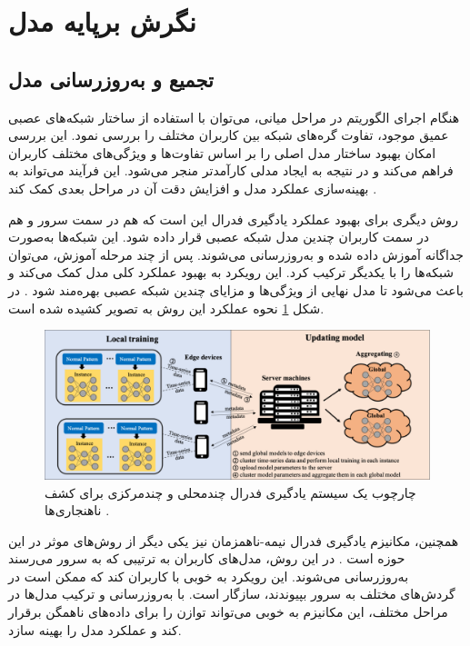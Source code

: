 \section{نگرش برپایه مدل}
\subsection{
	تجمیع و به‌روزرسانی مدل%
}	
هنگام اجرای الگوریتم در مراحل میانی، می‌توان با استفاده از ساختار شبکه‌های عصبی عمیق موجود، تفاوت گره‌های شبکه بین کاربران مختلف را بررسی نمود. این بررسی امکان بهبود ساختار مدل اصلی را بر اساس تفاوت‌ها و ویژگی‌های مختلف کاربران فراهم می‌کند و در نتیجه به ایجاد مدلی کارآمدتر منجر می‌شود. این فرآیند می‌تواند به بهینه‌سازی عملکرد مدل و افزایش دقت آن در مراحل بعدی کمک کند
\cite{sannara2021federated}.

روش دیگری برای بهبود عملکرد یادگیری فدرال این است که هم در سمت سرور و هم در سمت کاربران چندین مدل شبکه عصبی قرار داده شود. این شبکه‌ها به‌صورت جداگانه آموزش داده شده و به‌روزرسانی می‌شوند. پس از چند مرحله آموزش، می‌توان شبکه‌ها را با یکدیگر ترکیب کرد. این رویکرد به بهبود عملکرد کلی مدل کمک می‌کند و باعث می‌شود تا مدل نهایی از ویژگی‌ها و مزایای چندین شبکه عصبی بهره‌مند شود
\cite{qin2021mlmg}.
در شکل
\ref{multi_local_and_multi_global}
نحوه عملکرد این روش به تصویر کشیده شده است. 



\begin{figure}[t]
	\centering
	\includegraphics[scale=0.44]{images/chap3/multi_local_and_multi_global.png}%
	\caption{%
		چارچوب یک سیستم یادگیری فدرال چندمحلی و چندمرکزی برای کشف ناهنجاری‌ها 
		\cite{qin2021mlmg}%
		.
	}
	\label{multi_local_and_multi_global}
	\centering
\end{figure}



همچنین، مکانیزم یادگیری فدرال نیمه-ناهمزمان%
نیز یکی دیگر از روش‌های موثر در این حوزه است
\cite{ma2021fedsa}.
در این روش، مدل‌های کاربران به ترتیبی که به سرور می‌رسند به‌روزرسانی می‌شوند. این رویکرد به خوبی با کاربران کند%
که ممکن است در گردش‌های مختلف به سرور بپیوندند، سازگار است. با به‌روزرسانی و ترکیب مدل‌ها در مراحل مختلف، این مکانیزم به خوبی می‌تواند توازن را برای داده‌های ناهمگن برقرار کند و عملکرد مدل را بهینه سازد.

